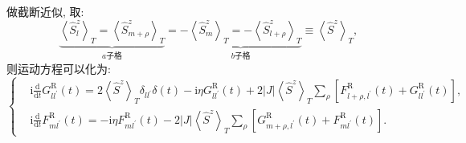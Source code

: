 做截断近似, 取:
\begin{equation}
\underbrace{\left\langle\hat{S}_{l}^{z}\right\rangle_{T}=\left\langle\hat{S}_{m+\rho}^{z}\right\rangle_{T}}_{a \text {子格}}=\underbrace{-\left\langle\hat{S}_{m}^{z}\right\rangle_{T}=-\left\langle\hat{S}_{l+\rho}^{z}\right\rangle_{T}}_{b \text{子格}}\equiv\left\langle\hat{S}^{z}\right\rangle_{T},
\end{equation}
则运动方程可以化为:
\begin{equation}
\left\{\begin{aligned}
&\mathrm{i} \frac{\mathrm{d}}{\mathrm{d} t} G_{l l^{\prime}}^\mathrm{R}(t)=2\left\langle\hat{S}^{z}\right\rangle_{T} \delta_{l l^{\prime}} \delta(t)-\mathrm{i} \eta G_{l l^{\prime}}^\mathrm{R}(t)+2|J|\left\langle\hat{S}^{z}\right\rangle_{T} \sum_{\rho}\left[F_{l+\rho, l^{\prime}}^\mathrm{R}(t)+G_{l l^{\prime}}^\mathrm{R}(t)\right], \\
&\mathrm{i} \frac{\mathrm{d}}{\mathrm{d} t} F_{m l^{\prime}}^\mathrm{R}(t)=-\mathrm{i} \eta F_{m l^{\prime}}^\mathrm{R}(t)-2|J|\left\langle\hat{S}^{z}\right\rangle_{T} \sum_{\rho}\left[G_{m+\rho, l^{\prime}}^\mathrm{R}(t)+F_{m l^{\prime}}^\mathrm{R}(t)\right].
\end{aligned}\right.
\end{equation}

